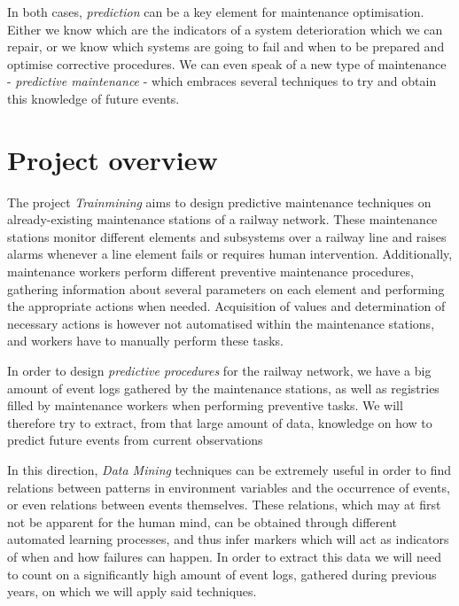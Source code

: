 \documentclass[a4paper,12pt]{article}
\begin{document}
In both cases, \emph{prediction} can be a key element for maintenance optimisation. Either we know which are the indicators of a system deterioration which we can repair, or we know which systems are going to fail and when to be prepared and optimise corrective procedures. We can even speak of a new type of maintenance - \emph{predictive maintenance} - which embraces several techniques to try and obtain this knowledge of future events.

\section{Project overview}
The project \emph{Trainmining} aims to design predictive maintenance techniques on already-existing maintenance stations of a railway network. These maintenance stations monitor different elements and subsystems over a railway line and raises alarms whenever a line element fails or requires human intervention. Additionally, maintenance workers perform different preventive maintenance procedures, gathering information about several parameters on each element and performing the appropriate actions when needed. Acquisition of values and determination of necessary actions is however not automatised within the maintenance stations, and workers have to manually perform these tasks.

In order to design \emph{predictive procedures} for the railway network, we have a big amount of event logs gathered by the maintenance stations, as well as registries filled by maintenance workers when performing preventive tasks. We will therefore try to extract, from that large amount of data, knowledge on how to predict future events from current observations

In this direction, \emph{Data Mining} techniques can be extremely useful in order to find relations between patterns in environment variables and the occurrence of events, or even relations between events themselves. These relations, which may at first not be apparent for the human mind, can be obtained through different automated learning processes, and thus infer markers which will act as indicators of when and how failures can happen. In order to extract this data we will need to count on a significantly high amount of event logs, gathered during previous years, on which we will apply said techniques.
\end{document}
